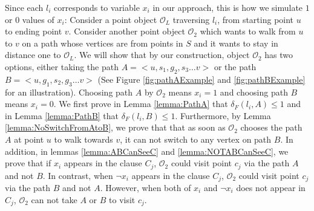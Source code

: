 \documentclass[a4paper,UKenglish]{lipics}
\newcommand{\CS}{{\mathscr S}}
\newcommand{\CO}{{\mathscr O}}
\newcommand{\CQ}{{\mathscr Q}}
\newcommand{\cfev}{{l}} \newcommand{\sq}{{\CS\CQ}}
\newcommand{\distF}{\delta_F}
\begin{document}
Since each $\cfev_i$ corresponds to variable $x_i$ in our approach, 
this is how we simulate $1$ or $0$ values of $x_i$:
Consider a point object $\CO_L$ 
traversing $\cfev_i$, from starting point $u$ to ending point $v$. 
Consider 
another point object $\CO_2$ which wants to 
walk from $u$ to $v$
on a path whose vertices are from points in $S$ and it wants to stay in distance one 
to $\CO_L$. We will show that 
by our construction, object $\CO_2$ has two options, either taking 
the path $A = <u,s_1,g_2,s_3 \dots v>$ or the path $B = <u,g_1,s_2,g_3 \dots v>$ 
(See Figure \ref{fig:pathAExample} and \ref{fig:pathBExample} for an illustration). 
Choosing path $A$ by $\CO_2$ means $x_i = 1$ and choosing path $B$ means $x_i = 0$.
We first prove in Lemma \ref{lemma:PathA} that $\distF(\cfev_i,A) \le 1 $ and 
in Lemma  \ref{lemma:PathB} that $\distF(\cfev_i,B) \le 1 $.
Furthermore, by
Lemma \ref{lemma:NoSwitchFromAtoB}, we prove that 
that as soon as $\CO_2$ chooses 
the path $A$ at point $u$ to walk towards $v$, 
it can not switch to any vertex on path $B$.
In addition, in lemmas \ref{lemma:ABCanSeeC} and \ref{lemma:NOTABCanSeeC}, we prove that 
if $x_i$ appears in the clause $C_j$,
$\CO_2$ could visit point $c_j$ via the path $A$ and not $B$. In contrast, 
when $\neg x_i$ appears in the clause $C_j$,
$\CO_2$ could visit point $c_j$ via the path $B$ and not $A$.
However, when both of  $x_i$ and $\neg x_i$ does not appear 
in $C_j$, $\CO_2$ can not take $A$
or $B$ to visit $c_j$.
\end{document}
